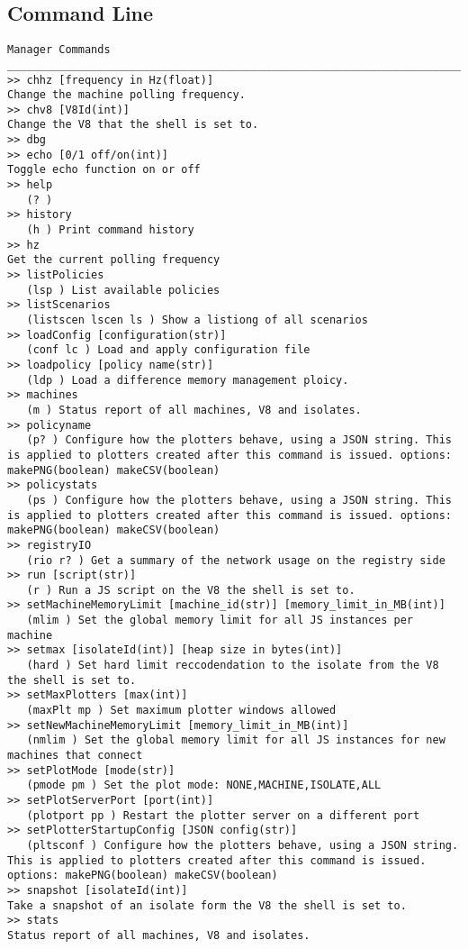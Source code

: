 \documentclass{l4proj}
\begin{document}
\begin{appendices}
\chapter{Command Line}
\label{allcommands}
\begin{lstlisting}
Manager Commands 
________________________________________________________________________________
>> chhz [frequency in Hz(float)]
Change the machine polling frequency.
>> chv8 [V8Id(int)]
Change the V8 that the shell is set to.
>> dbg
>> echo [0/1 off/on(int)]
Toggle echo function on or off
>> help
   (? ) 
>> history
   (h ) Print command history
>> hz
Get the current polling frequency
>> listPolicies
   (lsp ) List available policies
>> listScenarios
   (listscen lscen ls ) Show a listiong of all scenarios
>> loadConfig [configuration(str)]
   (conf lc ) Load and apply configuration file
>> loadpolicy [policy name(str)]
   (ldp ) Load a difference memory management ploicy.
>> machines
   (m ) Status report of all machines, V8 and isolates.
>> policyname
   (p? ) Configure how the plotters behave, using a JSON string. This is applied to plotters created after this command is issued. options: makePNG(boolean) makeCSV(boolean)
>> policystats
   (ps ) Configure how the plotters behave, using a JSON string. This is applied to plotters created after this command is issued. options: makePNG(boolean) makeCSV(boolean)
>> registryIO
   (rio r? ) Get a summary of the network usage on the registry side
>> run [script(str)]
   (r ) Run a JS script on the V8 the shell is set to.
>> setMachineMemoryLimit [machine_id(str)] [memory_limit_in_MB(int)]
   (mlim ) Set the global memory limit for all JS instances per machine
>> setmax [isolateId(int)] [heap size in bytes(int)]
   (hard ) Set hard limit reccodendation to the isolate from the V8 the shell is set to.
>> setMaxPlotters [max(int)]
   (maxPlt mp ) Set maximum plotter windows allowed
>> setNewMachineMemoryLimit [memory_limit_in_MB(int)]
   (nmlim ) Set the global memory limit for all JS instances for new machines that connect
>> setPlotMode [mode(str)]
   (pmode pm ) Set the plot mode: NONE,MACHINE,ISOLATE,ALL
>> setPlotServerPort [port(int)]
   (plotport pp ) Restart the plotter server on a different port
>> setPlotterStartupConfig [JSON config(str)]
   (pltsconf ) Configure how the plotters behave, using a JSON string. This is applied to plotters created after this command is issued. options: makePNG(boolean) makeCSV(boolean)
>> snapshot [isolateId(int)]
Take a snapshot of an isolate form the V8 the shell is set to.
>> stats
Status report of all machines, V8 and isolates.

\end{lstlisting}
\end{appendices}
\end{document}
